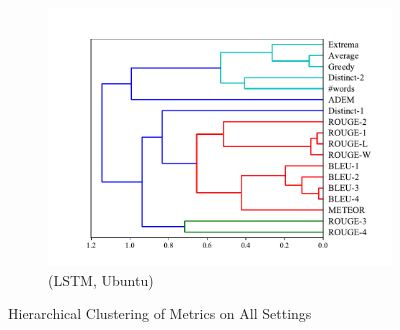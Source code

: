 \begin{figure}[htb]
\begin{subfigure}{0.33\linewidth}
        \includegraphics[width=\linewidth]{figure/plot/hierarchy/v2/pearson/lstm/ubuntu/plot.pdf}
        \caption{(LSTM, Ubuntu)}
    \end{subfigure}
    \caption{Hierarchical Clustering of Metrics on All Settings}
    \label{fig:hierarchy}
\end{figure}
